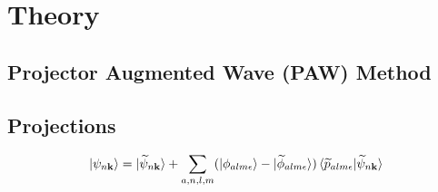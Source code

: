 \documentclass[12pt]{article}
\begin{document}
\newcommand{\ind}{lm\epsilon}

\section{Theory}

\subsection{Projector Augmented Wave (PAW) Method}

\subsection{Projections}
\begin{equation}
\ket{\psi_{n\mathbf{k}}}=\ket{\widetilde{\psi}_{n\mathbf{k}}}+
\sum_{a,n,l,m}(\ket{\phi_{a\ind}}-\ket{\widetilde{\phi}_{a\ind}})
\braket{\widetilde{p}_{a\ind}|\widetilde{\psi}_{n\mathbf{k}}}
\label{eq:1}
\end{equation}
\end{document}
